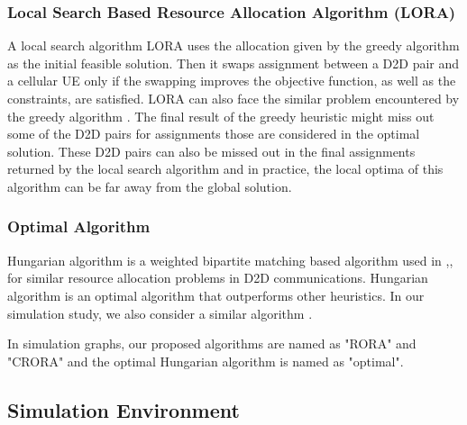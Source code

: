 \documentclass[times]{dacauth}
\begin{document}
\subsubsection{Local Search Based Resource Allocation Algorithm (LORA)} 
\noindent
A local search algorithm LORA \cite {lora} uses the allocation given by the greedy algorithm \cite{zulhasnine} as the initial feasible solution. Then it swaps assignment between a D2D pair and a cellular UE only if the swapping improves the objective function, as well as the constraints,  are satisfied. LORA can also face the similar problem encountered by the greedy algorithm \cite{zulhasnine}. The final result of the greedy heuristic might miss out some of the D2D pairs for assignments those are considered in the optimal solution. These D2D pairs can also be missed out in the final assignments returned by the local search algorithm and in practice, the local optima of this algorithm can be far away from the global solution.


\subsubsection{Optimal Algorithm}

\noindent
Hungarian algorithm \cite{hungarian} is a weighted bipartite matching based algorithm used in \cite {zhang},\cite{feng},\cite{ccnc} for similar resource allocation problems in D2D communications. Hungarian algorithm is an optimal algorithm that outperforms other heuristics. In our simulation study, we also consider a similar algorithm \cite{hungarian}.

\smallskip
\par
\noindent
In simulation graphs, our proposed algorithms are named as "RORA" and "CRORA" and the optimal Hungarian algorithm is named as "optimal".


\subsection{Simulation Environment}
\end{document}
